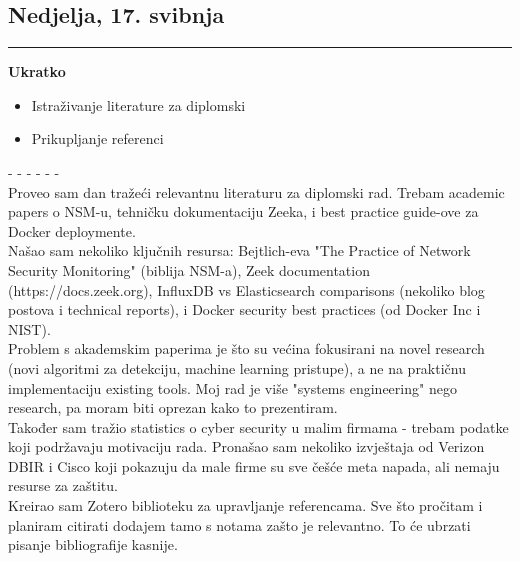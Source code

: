 \documentclass[12pt, a4paper]{article}
\newcommand{\dan}[1]{
    \subsection*{#1}
    \vspace{-0.5em} 
    \hrule \vspace{0.5em} 
}
\begin{document}
\dan{Nedjelja, 17. svibnja}
\textbf{Ukratko}
\begin{itemize}
    \item Istraživanje literature za diplomski
    \item Prikupljanje referenci
\end{itemize}
- - - - - - \\
Proveo sam dan tražeći relevantnu literaturu za diplomski rad. Trebam academic papers o NSM-u, tehničku dokumentaciju Zeeka, i best practice guide-ove za Docker deploymente.
\\
Našao sam nekoliko ključnih resursa: Bejtlich-eva "The Practice of Network Security Monitoring" (biblija NSM-a), Zeek documentation (https://docs.zeek.org), InfluxDB vs Elasticsearch comparisons (nekoliko blog postova i technical reports), i Docker security best practices (od Docker Inc i NIST).
\\
Problem s akademskim paperima je što su većina fokusirani na novel research (novi algoritmi za detekciju, machine learning pristupe), a ne na praktičnu implementaciju existing tools. Moj rad je više "systems engineering" nego research, pa moram biti oprezan kako to prezentiram.
\\
Također sam tražio statistics o cyber security u malim firmama - trebam podatke koji podržavaju motivaciju rada. Pronašao sam nekoliko izvještaja od Verizon DBIR i Cisco koji pokazuju da male firme su sve češće meta napada, ali nemaju resurse za zaštitu.
\\
Kreirao sam Zotero biblioteku za upravljanje referencama. Sve što pročitam i planiram citirati dodajem tamo s notama zašto je relevantno. To će ubrzati pisanje bibliografije kasnije.
\end{document}
